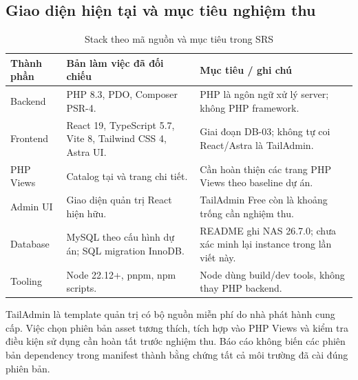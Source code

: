 \subsection{Giao diện hiện tại và mục tiêu nghiệm thu}
\begin{table}[H]\centering
\caption{Stack theo mã nguồn và mục tiêu trong SRS}\label{tab:stack}
\begin{tabularx}{\linewidth}{@{}P{2.5cm}YY@{}}\toprule
Thành phần & Bản làm việc đã đối chiếu & Mục tiêu / ghi chú\\ \midrule
Backend & PHP 8.3, PDO, Composer PSR-4. & PHP là ngôn ngữ xử lý server; không PHP framework.\\
Frontend & React 19, TypeScript 5.7, Vite 8, Tailwind CSS 4, Astra UI. & Giai đoạn DB-03; không tự coi React/Astra là TailAdmin.\\
PHP Views & Catalog tại  và trang chi tiết. & Cần hoàn thiện các trang PHP Views theo baseline dự án.\\
Admin UI & Giao diện quản trị React hiện hữu. & TailAdmin Free còn là khoảng trống cần nghiệm thu.\\
Database & MySQL theo cấu hình dự án; SQL migration InnoDB. & README ghi NAS 26.7.0; chưa xác minh lại instance trong lần viết này.\\
Tooling & Node 22.12+, pnpm, npm scripts. & Node dùng build/dev tools, không thay PHP backend.\\
\bottomrule\end{tabularx}
\end{table}

TailAdmin là template quản trị có bộ nguồn miễn phí do nhà phát hành cung cấp.\cite{tailadmin} Việc chọn phiên bản asset tương thích, tích hợp vào PHP Views và kiểm tra điều kiện sử dụng cần hoàn tất trước nghiệm thu. Báo cáo không biến các phiên bản dependency trong manifest thành bằng chứng tất cả môi trường đã cài đúng phiên bản.
\clearpage
